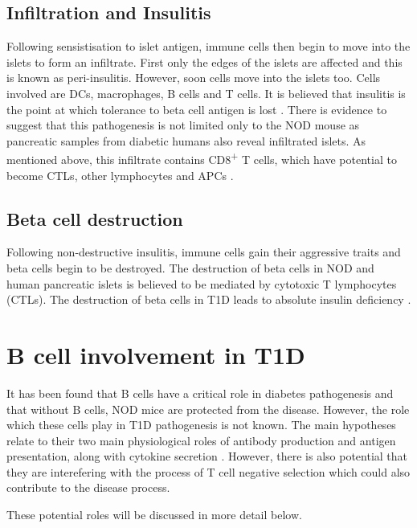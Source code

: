 \subsection{Infiltration and Insulitis}

Following sensistisation to islet antigen, immune cells then begin to move into the islets to form an infiltrate.
First only the edges of the islets are affected and this is known as peri-insulitis\citep{Thomas2000}.
However, soon cells move into the islets too.
Cells involved are DCs, macrophages, B cells and T cells\citep{Brodie2008}.
It is believed that insulitis is the point at which tolerance to beta cell antigen is lost \citep{Thomas2000}.
There is evidence to suggest that this pathogenesis is not limited only to the NOD mouse as pancreatic samples from diabetic humans also reveal infiltrated islets.
As mentioned above, this infiltrate contains CD8\textsuperscript{+} T cells, which have potential to become CTLs, other lymphocytes and APCs \citep{Hanafusa2008}.

\subsection{Beta cell destruction}

Following non-destructive insulitis, immune cells gain their aggressive traits and beta cells begin to be destroyed.
The destruction of beta cells in NOD and human pancreatic islets is believed to be mediated by cytotoxic T lymphocytes (CTLs)\citep{Thomas2000, Brodie2008, Hanafusa2008}.
The destruction of beta cells in T1D leads to absolute insulin deficiency \citep{Daneman2006}.


\section{B cell involvement in T1D}
\label{sec:BcellsinT1D}

It has been found that B cells have a critical role in diabetes pathogenesis and that without B cells, NOD mice are protected from the disease.
However, the role which these cells play in T1D pathogenesis is not known.
The main hypotheses relate to their two main physiological roles of antibody production and antigen presentation, along with cytokine secretion \citep{Hinman2014}.
However, there is also potential that they are interefering with the process of T cell negative selection which could also contribute to the disease process.

These potential roles will be discussed in more detail below.

